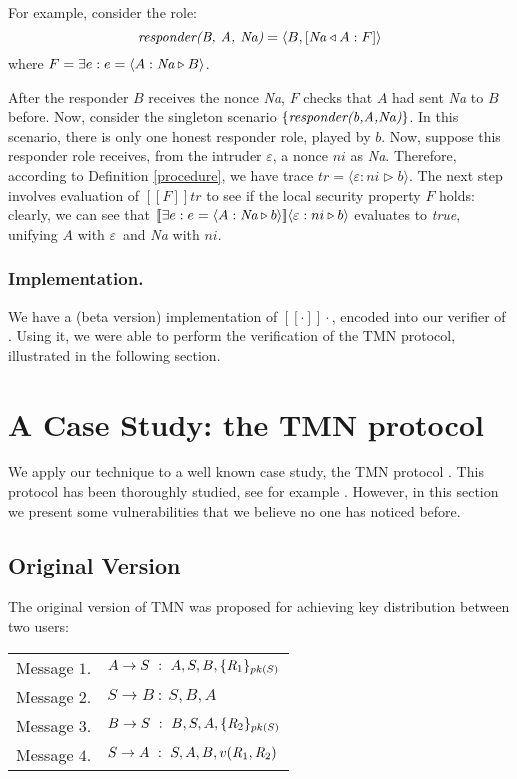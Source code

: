 \documentclass{entcs} \usepackage{entcsmacro}
\newcommand{\INT}{\ensuremath{\varepsilon}}
\begin{document}
For example, consider the role:
$$\emph{responder(B, A, Na)} = \langle B, [ \emph{Na} \triangleleft A:
F]\rangle$$ where $F = \exists
e: e=\langle A: \emph{Na} \triangleright B\rangle$.

After the responder $B$ receives the nonce \emph{Na}, $F$ checks that 
$A$ had sent \emph{Na} to $B$ before. Now, consider the
singleton scenario $\{ \emph{responder(b,A,Na)} \}$. In this scenario,
there is only one honest responder role, played by $b$. Now, suppose
this responder role receives, from the intruder $\varepsilon$, a nonce
$ni$ as \emph{Na}. Therefore, according to Definition \ref{procedure},
we have trace $tr= \langle \INT: ni \triangleright b \rangle$. The
next step involves evaluation of $[\![F]\!] tr$ to see if the local
security property $F$ holds: clearly, we can see that $[\![ \exists e:
e=\langle A: \emph{Na} \triangleright b\rangle ]\!] \langle \INT: ni
\triangleright b \rangle$ evaluates to \emph{true}, unifying $A$ with
\INT \ and \emph{Na} with $ni$. 

\subsubsection{Implementation.}
We have a (beta version) implementation of $[\![ \cdot ]\!]\cdot$,
encoded into our verifier of \cite{CE02}. Using it, we were able to
perform the verification of the TMN protocol, illustrated in the
following section.

\section{A Case Study: the TMN protocol}
\label{sec:tmn}
We apply our technique to a well known case study, the TMN protocol
\cite{tmn90}. This protocol has been thoroughly studied, see for
example \cite{Roscoe96,MMS97,LR97}. However, in this section we
present some vulnerabilities that we believe no one
has noticed before.%

\subsection{Original Version}
The original version of TMN was proposed
for achieving key distribution between two users:\\

\begin{tabular}{c l}
Message $1$.&$A \rightarrow S \ : \ A,S,B, \{\emph{R}_1\}_{pk(S)} $ \\
Message $2$.&$S \rightarrow B \ : \ S,B,A $ \\
Message $3$.&$B \rightarrow S \ : \ B,S,A, \{\emph{R}_2\}_{pk(S)} $ \\
Message $4$.&$S \rightarrow A \ : \ S,A,B, v(\emph{R}_1,\emph{R}_2) $ \\
\end{tabular}\\
\end{document}

